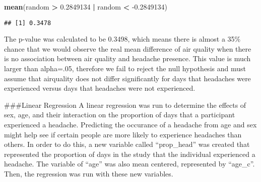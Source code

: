 \documentclass[]{article}
\newenvironment{Shaded}{\begin{snugshade}}{\end{snugshade}}
\newcommand{\DataTypeTok}[1]{\textcolor[rgb]{0.13,0.29,0.53}{#1}}
\newcommand{\FloatTok}[1]{\textcolor[rgb]{0.00,0.00,0.81}{#1}}
\newcommand{\KeywordTok}[1]{\textcolor[rgb]{0.13,0.29,0.53}{\textbf{#1}}}
\newcommand{\NormalTok}[1]{#1}
\newcommand{\OperatorTok}[1]{\textcolor[rgb]{0.81,0.36,0.00}{\textbf{#1}}}
\newcommand{\StringTok}[1]{\textcolor[rgb]{0.31,0.60,0.02}{#1}}
\begin{document}
\begin{Shaded}
\begin{Highlighting}[]
\KeywordTok{mean}\NormalTok{(random }\OperatorTok{>}\StringTok{ }\FloatTok{0.2849134} \OperatorTok{|}\StringTok{ }\NormalTok{random }\OperatorTok{<}\StringTok{ }\FloatTok{-0.2849134}\NormalTok{)}
\end{Highlighting}
\end{Shaded}

\begin{verbatim}
## [1] 0.3478
\end{verbatim}

The p-value was calculated to be 0.3498, which means there is almost a
35\% chance that we would observe the real mean difference of air
quality when there is no association between air quality and headache
presence. This value is much larger than alpha=.05, therefore we fail to
reject the null hypothesis and must assume that airquality does not
differ significantly for days that headaches were experienced versus
days that headaches were not experienced.

\#\#\#Linear Regression A linear regression was run to determine the
effects of sex, age, and their interaction on the proportion of days
that a participant experienced a headache. Predicting the occurance of a
headache from age and sex might help see if certain people are more
likely to experience headaches than others. In order to do this, a new
variable called ``prop\_head'' was created that represented the
proportion of days in the study that the individual experienced a
headache. The variable of ``age'' was also mean centered, represented by
``age\_c''. Then, the regression was run with these new variables.

\begin{Shaded}
\end{Shaded}
\end{document}
